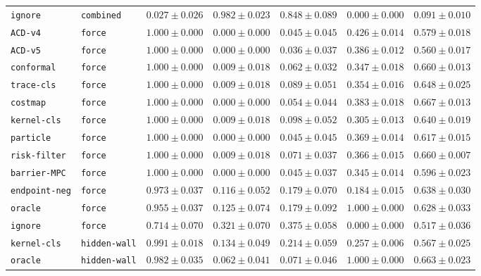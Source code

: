 \documentclass{article}
\begin{document}
\begin{center}
{\begin{tabular}{llccccc}
\texttt{ignore} & \texttt{combined} & $0.027 \pm 0.026$ & $0.982 \pm 0.023$ & $0.848 \pm 0.089$ & $0.000 \pm 0.000$ & $0.091 \pm 0.010$ \\
\texttt{ACD-v4} & \texttt{force} & $1.000 \pm 0.000$ & $0.000 \pm 0.000$ & $0.045 \pm 0.045$ & $0.426 \pm 0.014$ & $0.579 \pm 0.018$ \\
\texttt{ACD-v5} & \texttt{force} & $1.000 \pm 0.000$ & $0.000 \pm 0.000$ & $0.036 \pm 0.037$ & $0.386 \pm 0.012$ & $0.560 \pm 0.017$ \\
\texttt{conformal} & \texttt{force} & $1.000 \pm 0.000$ & $0.009 \pm 0.018$ & $0.062 \pm 0.032$ & $0.347 \pm 0.018$ & $0.660 \pm 0.013$ \\
\texttt{trace-cls} & \texttt{force} & $1.000 \pm 0.000$ & $0.009 \pm 0.018$ & $0.089 \pm 0.051$ & $0.354 \pm 0.016$ & $0.648 \pm 0.025$ \\
\texttt{costmap} & \texttt{force} & $1.000 \pm 0.000$ & $0.000 \pm 0.000$ & $0.054 \pm 0.044$ & $0.383 \pm 0.018$ & $0.667 \pm 0.013$ \\
\texttt{kernel-cls} & \texttt{force} & $1.000 \pm 0.000$ & $0.009 \pm 0.018$ & $0.098 \pm 0.052$ & $0.305 \pm 0.013$ & $0.640 \pm 0.019$ \\
\texttt{particle} & \texttt{force} & $1.000 \pm 0.000$ & $0.000 \pm 0.000$ & $0.045 \pm 0.045$ & $0.369 \pm 0.014$ & $0.617 \pm 0.015$ \\
\texttt{risk-filter} & \texttt{force} & $1.000 \pm 0.000$ & $0.009 \pm 0.018$ & $0.071 \pm 0.037$ & $0.366 \pm 0.015$ & $0.660 \pm 0.007$ \\
\texttt{barrier-MPC} & \texttt{force} & $1.000 \pm 0.000$ & $0.000 \pm 0.000$ & $0.045 \pm 0.037$ & $0.345 \pm 0.014$ & $0.596 \pm 0.023$ \\
\texttt{endpoint-neg} & \texttt{force} & $0.973 \pm 0.037$ & $0.116 \pm 0.052$ & $0.179 \pm 0.070$ & $0.184 \pm 0.015$ & $0.638 \pm 0.030$ \\
\texttt{oracle} & \texttt{force} & $0.955 \pm 0.037$ & $0.125 \pm 0.074$ & $0.179 \pm 0.092$ & $1.000 \pm 0.000$ & $0.628 \pm 0.033$ \\
\texttt{ignore} & \texttt{force} & $0.714 \pm 0.070$ & $0.321 \pm 0.070$ & $0.375 \pm 0.058$ & $0.000 \pm 0.000$ & $0.517 \pm 0.036$ \\
\texttt{kernel-cls} & \texttt{hidden-wall} & $0.991 \pm 0.018$ & $0.134 \pm 0.049$ & $0.214 \pm 0.059$ & $0.257 \pm 0.006$ & $0.567 \pm 0.025$ \\
\texttt{oracle} & \texttt{hidden-wall} & $0.982 \pm 0.035$ & $0.062 \pm 0.041$ & $0.071 \pm 0.046$ & $1.000 \pm 0.000$ & $0.663 \pm 0.023$ \\

\end{tabular}}
\end{center}
\end{document}
